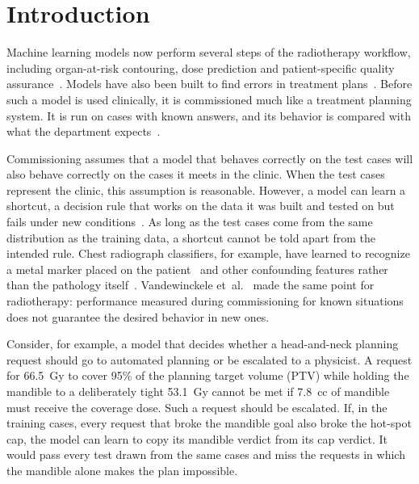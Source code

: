 \documentclass[aps,prx,reprint,superscriptaddress,nofootinbib]{revtex4-2}
\begin{document}
\section{Introduction}\label{introduction}

Machine learning models now perform several steps of the radiotherapy workflow, including
organ-at-risk contouring, dose prediction and patient-specific quality
assurance~\cite{vandewinckele2020}. Models have also been built to find errors in treatment
plans~\cite{kalet2015,luk2019}. Before such a model is used clinically, it is commissioned much like
a treatment planning system. It is run on cases with known answers, and its behavior is compared
with what the department expects~\cite{mahadevaiah2020,hurkmans2024}.

Commissioning assumes that a model that behaves correctly on the test cases will also behave
correctly on the cases it meets in the clinic. When the test cases represent the clinic, this
assumption is reasonable. However, a model can learn a shortcut, a decision rule that works on the
data it was built and tested on but fails under new conditions~\cite{geirhos2020}. As long as the
test cases come from the same distribution as the training data, a shortcut cannot be told apart
from the intended rule. Chest radiograph classifiers, for example, have learned to recognize a metal
marker placed on the patient~\cite{zech2018} and other confounding features rather than the
pathology itself~\cite{degrave2021}. Vandewinckele et~al.~\cite{vandewinckele2020} made the same
point for radiotherapy: performance measured during commissioning for known situations does not
guarantee the desired behavior in new ones.

Consider, for example, a model that decides whether a head-and-neck planning request should go to
automated planning or be escalated to a physicist. A request for 66.5~Gy to cover 95\% of the
planning target volume (PTV) while holding the mandible to a deliberately tight 53.1~Gy cannot be
met if 7.8~cc of mandible must receive the coverage dose. Such a request should be escalated. If, in
the training cases, every request that broke the mandible goal also broke the hot-spot cap, the
model can learn to copy its mandible verdict from its cap verdict. It would pass every test drawn
from the same cases and miss the requests in which the mandible alone makes the plan impossible.
\end{document}
